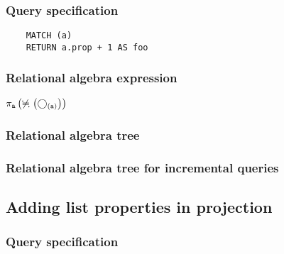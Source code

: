 	\subsubsection*{Query specification}

	\begin{lstlisting}
	MATCH (a)
	RETURN a.prop + 1 AS foo
	\end{lstlisting}


	\subsubsection*{Relational algebra expression}

	$\projection{\var{a}} \left(\alldifferent{} \left(\getvertices{a}{}\right)\right)$

	\subsubsection*{Relational algebra tree}


	\subsubsection*{Relational algebra tree for incremental queries}

	\subsection{Adding list properties in projection}

	\subsubsection*{Query specification}

